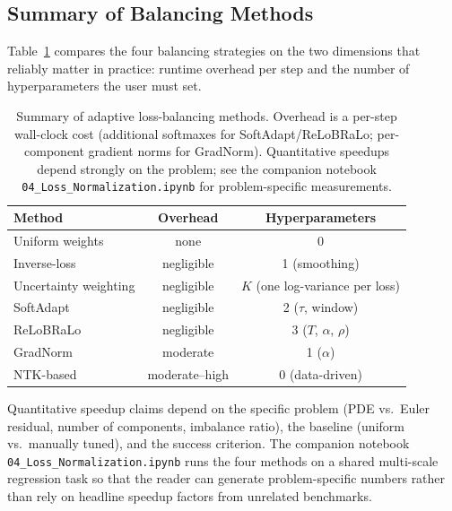 \documentclass[11pt,a4paper]{report}
\begin{document}
\subsection{Summary of Balancing Methods}

Table~\ref{tab:balancing_methods} compares the four balancing strategies on the two dimensions that reliably matter in practice: runtime overhead per step and the number of hyperparameters the user must set.

\begin{table}[ht]
\centering
\small
\begin{tabular}{l c c}
\toprule
\textbf{Method} & \textbf{Overhead} & \textbf{Hyperparameters} \\
\midrule
Uniform weights & none & 0 \\
Inverse-loss & negligible & 1 (smoothing) \\
Uncertainty weighting \citep{kendall2018multi} & negligible & $K$ (one log-variance per loss) \\
SoftAdapt \citep{heydari2019softadapt} & negligible & 2 ($\tau$, window) \\
ReLoBRaLo \citep{bischof2025relobralo} & negligible & 3 ($T$, $\alpha$, $\rho$) \\
GradNorm \citep{chen2018gradnorm} & moderate & 1 ($\alpha$) \\
NTK-based \citep{wang2022when} & moderate--high & 0 (data-driven) \\
\bottomrule
\end{tabular}
\caption{Summary of adaptive loss-balancing methods.  Overhead is a per-step wall-clock cost (additional softmaxes for SoftAdapt/ReLoBRaLo; per-component gradient norms for GradNorm).  Quantitative speedups depend strongly on the problem; see the companion notebook \texttt{04\_Loss\_Normalization.ipynb} for problem-specific measurements.}
\label{tab:balancing_methods}
\end{table}

Quantitative speedup claims depend on the specific problem (PDE vs.\ Euler residual, number of components, imbalance ratio), the baseline (uniform vs.\ manually tuned), and the success criterion.  The companion notebook \texttt{04\_Loss\_Normalization.ipynb} runs the four methods on a shared multi-scale regression task so that the reader can generate problem-specific numbers rather than rely on headline speedup factors from unrelated benchmarks.
\end{document}
